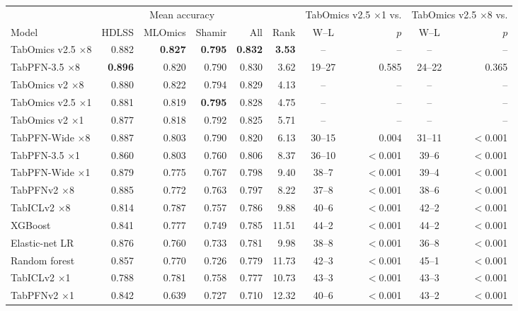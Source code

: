 \begin{tabular}{lrrrrrcrcr}
\toprule
 & \multicolumn{4}{c}{Mean accuracy} & & \multicolumn{2}{c}{TabOmics v2.5 $\times$1 vs.} & \multicolumn{2}{c}{TabOmics v2.5 $\times$8 vs.} \\
\cmidrule(lr){2-5} \cmidrule(lr){7-8} \cmidrule(lr){9-10}
Model & HDLSS & MLOmics & Shamir & All & Rank & W--L & $p$ & W--L & $p$ \\
\midrule
TabOmics v2.5 $\times$8 & 0.882 & \textbf{0.827} & \textbf{0.795} & \textbf{0.832} & \textbf{3.53} & -- & -- & -- & -- \\
TabPFN-3.5 $\times$8 & \textbf{0.896} & 0.820 & 0.790 & 0.830 & 3.62 & 19--27 & 0.585 & 24--22 & 0.365 \\
TabOmics v2 $\times$8 & 0.880 & 0.822 & 0.794 & 0.829 & 4.13 & -- & -- & -- & -- \\
TabOmics v2.5 $\times$1 & 0.881 & 0.819 & \textbf{0.795} & 0.828 & 4.75 & -- & -- & -- & -- \\
TabOmics v2 $\times$1 & 0.877 & 0.818 & 0.792 & 0.825 & 5.71 & -- & -- & -- & -- \\
TabPFN-Wide $\times$8 & 0.887 & 0.803 & 0.790 & 0.820 & 6.13 & 30--15 & 0.004 & 31--11 & $<$0.001 \\
TabPFN-3.5 $\times$1 & 0.860 & 0.803 & 0.760 & 0.806 & 8.37 & 36--10 & $<$0.001 & 39--6 & $<$0.001 \\
TabPFN-Wide $\times$1 & 0.879 & 0.775 & 0.767 & 0.798 & 9.40 & 38--7 & $<$0.001 & 39--4 & $<$0.001 \\
TabPFNv2 $\times$8 & 0.885 & 0.772 & 0.763 & 0.797 & 8.22 & 37--8 & $<$0.001 & 38--6 & $<$0.001 \\
TabICLv2 $\times$8 & 0.814 & 0.787 & 0.757 & 0.786 & 9.88 & 40--6 & $<$0.001 & 42--2 & $<$0.001 \\
XGBoost & 0.841 & 0.777 & 0.749 & 0.785 & 11.51 & 44--2 & $<$0.001 & 44--2 & $<$0.001 \\
Elastic-net LR & 0.876 & 0.760 & 0.733 & 0.781 & 9.98 & 38--8 & $<$0.001 & 36--8 & $<$0.001 \\
Random forest & 0.857 & 0.770 & 0.726 & 0.779 & 11.73 & 42--3 & $<$0.001 & 45--1 & $<$0.001 \\
TabICLv2 $\times$1 & 0.788 & 0.781 & 0.758 & 0.777 & 10.73 & 43--3 & $<$0.001 & 43--3 & $<$0.001 \\
TabPFNv2 $\times$1 & 0.842 & 0.639 & 0.727 & 0.710 & 12.32 & 40--6 & $<$0.001 & 43--2 & $<$0.001 \\
\bottomrule
\end{tabular}

